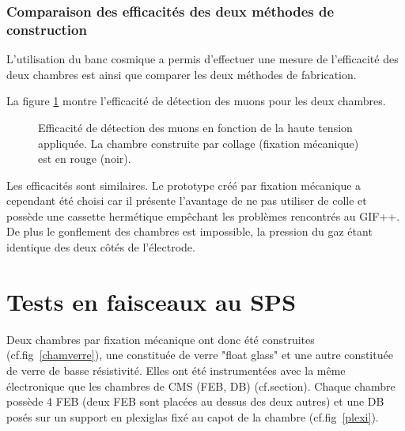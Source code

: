  \subsubsection{Comparaison des efficacités des deux méthodes de construction}
L'utilisation du banc cosmique a permis d'effectuer une mesure de l'efficacité des deux chambres est ainsi que comparer les deux méthodes de fabrication.

La figure \ref{comparaison2} montre l'efficacité de détection des muons pour les deux chambres.

\begin{figure}[!ht]
	\centering
	\caption{Efficacité de détection des muons en fonction de la haute tension appliquée. La chambre construite par collage (fixation mécanique) est en rouge (noir).}
	\label{comparaison2}
\end{figure}

Les efficacités sont similaires. Le prototype créé par fixation mécanique a cependant été choisi car il présente l'avantage de ne pas utiliser de colle et possède une cassette hermétique empêchant les problèmes rencontrés au GIF++. De plus le gonflement des chambres est impossible, la pression du gaz étant identique des deux côtés de l'électrode.

\section{Tests en faisceaux au SPS}
Deux chambres par fixation mécanique ont donc été construites (cf.fig~\ref{chamverre}), une constituée de verre "float glass" et une autre constituée de verre de basse résistivité. Elles ont été instrumentées avec la même électronique que les chambres de CMS (FEB, DB) (cf.section\label{cmselec}). Chaque chambre possède \num{4} FEB (deux FEB sont placées au dessus des deux autres) et une DB posés sur un support en plexiglas fixé au capot de la chambre (cf.fig~\ref{plexi}).

